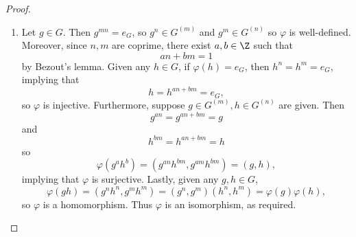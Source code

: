 \documentclass[pmath347]{subfiles}
\begin{document}
    \begin{proof}
        \begin{enumerate}
            \item Let $g\in G$. Then $g^{mn} = e_G$, so $g^n \in G^{\left( m \right) }$ and $g^m\in G^{\left( n \right) }$ so $\varphi$ is well-defined. Moreover, since $n,m$ are coprime, there exist $a,b\in\Z$ such that
                \begin{equation*}
                    an+bm = 1
                \end{equation*}
                by Bezout's lemma. Given any $h\in G$, if $\varphi\left( h \right) =e_G$, then $h^n = h^m = e_G$, implying that
                \begin{equation*}
                    h = h^{an+bm} = e_G,
                \end{equation*}
                so $\varphi$ is injective. Furthermore, suppose $g\in G^{\left( m \right) }, h\in G^{\left( n \right)}$ are given. Then
                \begin{equation*}
                    g^{an} = g^{an+bm} = g
                \end{equation*}
                and
                \begin{equation*}
                    h^{bm} = h^{an+bm} = h
                \end{equation*}
                so
                \begin{equation*}
                    \varphi\left( g^ah^b \right) = \left( g^{an}h^{bm}, g^{am}h^{bm} \right) = \left( g,h \right) ,
                \end{equation*}
                implying that $\varphi$ is surjective. Lastly, given any $g,h\in G$,
                \begin{equation*}
                    \varphi\left( gh \right) = \left( g^nh^n, g^mh^m \right) = \left( g^n,g^m \right) \left( h^n,h^m \right) = \varphi\left( g \right) \varphi\left( h \right) ,
                \end{equation*}
                so $\varphi$ is a homomorphism. Thus $\varphi$ is an isomorphism, as required. \qqqedsym


\end{enumerate}
\end{proof}
\end{document}
